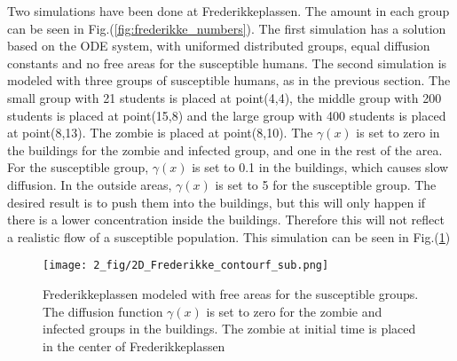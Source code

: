 \documentclass[%
twoside,                 %
final,                   %
chapterprefix=true,      %
open=right               %
10pt]{book}
\begin{document}
\vspace{3mm}




\vspace{3mm}


Two simulations have been done at Frederikkeplassen. The amount in each group can be seen in Fig.(\ref{fig:frederikke_numbers}). The first simulation has a solution based on the ODE system, with uniformed distributed groups, equal diffusion constants and no free areas for the susceptible humans. The second simulation is modeled with three groups of susceptible humans, as in the previous section. The small group with 21 students is placed at point(4,4), the middle group with 200 students is placed at point(15,8) and the large group with 400 students is placed at point(8,13). The zombie is placed at point(8,10). The $\gamma(x)$ is set to zero in the buildings for the zombie and infected group, and one in the rest of the area. For the susceptible group, $\gamma(x)$ is set to 0.1 in the buildings, which causes slow diffusion. In the outside areas, $\gamma(x)$ is set to 5 for the susceptible group. The desired result is to push them into the buildings, but this will only happen if there is a lower concentration inside the buildings. Therefore this will not reflect a realistic flow of a susceptible population. This simulation can be seen in Fig.(\ref{fig:frederikke_free_area})  


\begin{figure}[ht]
  \centerline{\texttt{[image: 2\_fig/2D\_Frederikke\_contourf\_sub.png]}}
  \caption{
  \label{fig:frederikke_free_area} Frederikkeplassen modeled with free areas for the susceptible groups. The diffusion function $\gamma(x)$ is set to zero for the zombie and infected groups in the buildings. The zombie at initial time is placed in the center of Frederikkeplassen
  }
\end{figure}




\vspace{3mm}




\vspace{3mm}
\end{document}
